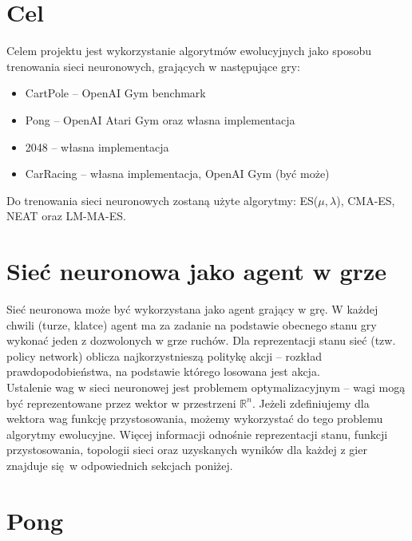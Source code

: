 \documentclass[polish]{article}
\begin{document}
    \begin{roboto}
    \section{\textbf{\textcolor{calpolypomonagreen}{Cel}}}
    
    Celem projektu jest wykorzystanie algorytmów ewolucyjnych jako sposobu trenowania sieci neuronowych,
    grających w następujące gry:
    \begin{itemize}
        \item CartPole -- OpenAI Gym benchmark
        \item Pong -- OpenAI Atari Gym oraz własna implementacja
        \item 2048 -- własna implementacja
        \item CarRacing -- własna implementacja, OpenAI Gym (być może)
    \end{itemize}

    \noindent Do trenowania sieci neuronowych zostaną użyte algorytmy: ES($\mu, \lambda$), CMA-ES, NEAT oraz LM-MA-ES.

    \section{\textbf{\textcolor{calpolypomonagreen}{Sieć neuronowa jako agent w grze}}}

    Sieć neuronowa może być wykorzystana jako agent grający w grę. W każdej chwili (turze, klatce) agent ma za
    zadanie na podstawie obecnego stanu gry wykonać jeden z dozwolonych w grze ruchów. Dla reprezentacji stanu
    sieć (tzw. policy network) oblicza najkorzystnieszą politykę akcji -- rozkład prawdopodobieństwa, na podstawie
    którego losowana jest akcja. \\

    \noindent Ustalenie wag w sieci neuronowej jest problemem optymalizacyjnym -- wagi mogą być reprezentowane przez wektor
    w przestrzeni $\mathbb{R}^n$. Jeżeli zdefiniujemy dla wektora wag funkcję przystosowania, możemy wykorzystać
    do tego problemu algorytmy ewolucyjne. Więcej informacji odnośnie reprezentacji stanu, funkcji przystosowania,
    topologii sieci oraz uzyskanych wyników dla każdej z gier znajduje się w odpowiednich sekcjach poniżej.


    \section{\textbf{\textcolor{calpolypomonagreen}{Pong}}}




\end{roboto}
\end{document}

